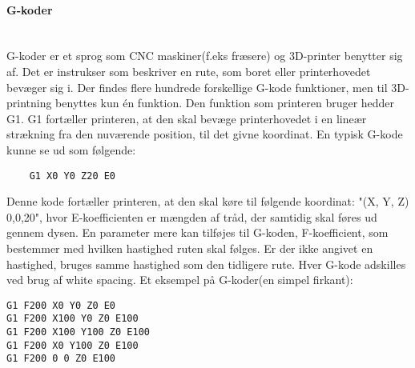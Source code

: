 
\paragraph{G-koder} %
\\
G-koder er et sprog som CNC maskiner(f.eks fræsere) og 3D-printer benytter sig af. Det er instrukser som beskriver en rute, som boret eller printerhovedet bevæger sig i. \cite{gkode} 
Der findes flere hundrede forskellige G-kode funktioner, men til 3D-printning benyttes kun én funktion. Den funktion som printeren bruger hedder G1. G1 fortæller printeren, at den skal bevæge printerhovedet i en lineær strækning fra den nuværende position, til det givne koordinat.
En typisk G-kode kunne se ud som følgende: 

\begin{verbatim}
	G1 X0 Y0 Z20 E0
\end{verbatim}


Denne kode fortæller printeren, at den skal køre til følgende koordinat: "(X, Y, Z) 0,0,20", hvor E-koefficienten er mængden af tråd, der samtidig skal føres ud gennem dysen.
En parameter mere kan tilføjes til G-koden, F-koefficient, som bestemmer med hvilken hastighed ruten skal følges. Er der ikke angivet en hastighed, bruges samme hastighed som den tidligere rute. 
Hver G-kode adskilles ved brug af white spacing.
Et eksempel på G-koder(en simpel firkant):
\begin{lstlisting}
G1 F200 X0 Y0 Z0 E0
G1 F200 X100 Y0 Z0 E100
G1 F200 X100 Y100 Z0 E100
G1 F200 X0 Y100 Z0 E100
G1 F200 0 0 Z0 E100
\end{lstlisting}